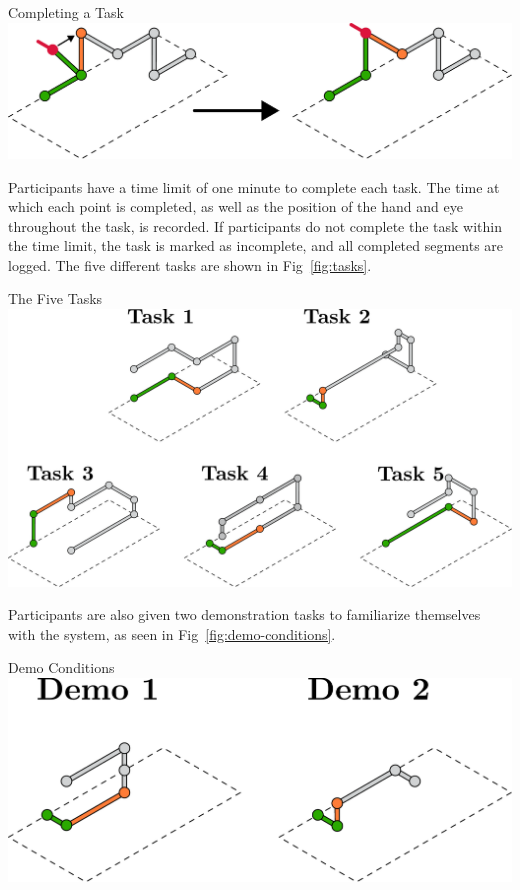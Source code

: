 \begin{figureBox}[label={fig:task-example}, width=0.8\linewidth]{Completing a Task}
    \includegraphics[width=0.8\linewidth]{./implementation/figures/task-example.pdf}
\end{figureBox}

Participants have a time limit of one minute to complete each task. The time at which each point is completed, as well as the position of the hand and eye throughout the task, is recorded. If participants do not complete the task within the time limit, the task is marked as incomplete, and all completed segments are logged. The five different tasks are shown in Fig~\ref{fig:tasks}.

\begin{figureBox}[label={fig:tasks}, width=0.8\linewidth]{The Five Tasks}
    \includegraphics[width=1.0\linewidth]{./implementation/figures/tasks.pdf}
\end{figureBox}

Participants are also given two demonstration tasks to familiarize themselves with the system, as seen in Fig~\ref{fig:demo-conditions}.

\begin{figureBox}[label={fig:demo-conditions}, width=0.8\linewidth]{Demo Conditions}
    \includegraphics[width=0.65\linewidth]{./implementation/figures/demos.pdf}
\end{figureBox}

